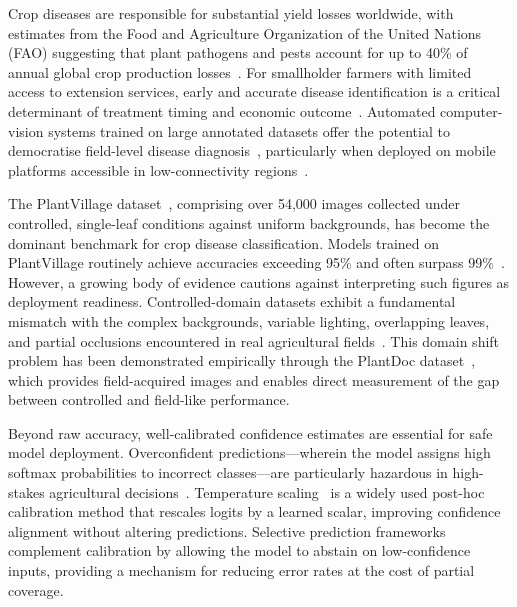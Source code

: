 \documentclass[conference]{IEEEtran}
\begin{document}
Crop diseases are responsible for substantial yield losses worldwide, with
estimates from the Food and Agriculture Organization of the United Nations (FAO)
suggesting that plant pathogens and pests account for up to 40\% of annual
global crop production losses~\cite{savary2019global,fao2021state}.
For smallholder farmers with limited access to extension services, early and
accurate disease identification is a critical determinant of treatment timing
and economic outcome~\cite{pound2017uncertainty,bhatt2022farmer}. Automated
computer-vision systems trained on large annotated datasets offer the potential
to democratise field-level disease diagnosis~\cite{mohanty2016deep,ferentinos2018deep},
particularly when deployed on mobile platforms accessible in low-connectivity
regions~\cite{ramcharan2017deep,atila2021plant}.

The PlantVillage dataset~\cite{hughes2015open,sladojevic2016deep}, comprising
over 54,000 images collected under controlled, single-leaf conditions against
uniform backgrounds, has become the dominant benchmark for crop disease
classification. Models trained on PlantVillage routinely achieve accuracies
exceeding 95\% and often surpass 99\%~\cite{mohanty2016deep,too2019comparative,kamilaris2018deep}.
However, a growing body of evidence cautions against interpreting such figures
as deployment readiness. Controlled-domain datasets exhibit a fundamental
mismatch with the complex backgrounds, variable lighting, overlapping leaves,
and partial occlusions encountered in real agricultural
fields~\cite{ferentinos2018deep,thenmozhi2019crop,chen2020using}.
This domain shift problem has been demonstrated empirically through the
PlantDoc dataset~\cite{singh2020plantdoc}, which provides field-acquired images
and enables direct measurement of the gap between controlled and field-like
performance.

Beyond raw accuracy, well-calibrated confidence estimates are essential for safe
model deployment. Overconfident predictions---wherein the model assigns high
softmax probabilities to incorrect classes---are particularly hazardous in
high-stakes agricultural decisions~\cite{guo2017calibration,minderer2021revisiting}.
Temperature scaling~\cite{guo2017calibration} is a widely used post-hoc
calibration method that rescales logits by a learned scalar, improving
confidence alignment without altering predictions. Selective prediction
frameworks~\cite{geifman2017selective,el2010foundations} complement calibration
by allowing the model to abstain on low-confidence inputs, providing a mechanism
for reducing error rates at the cost of partial coverage.
\end{document}
